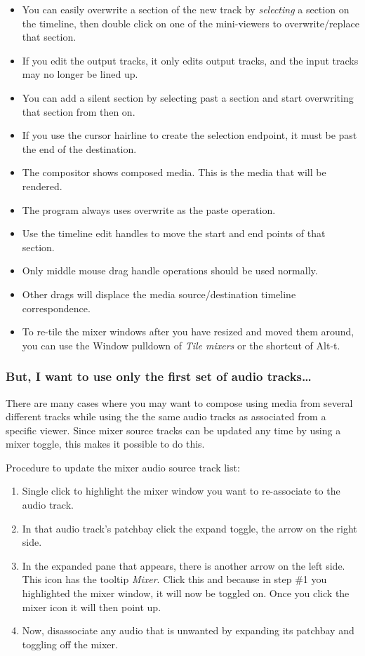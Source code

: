 \begin{itemize}
	\item You can easily overwrite a section of the new track by \textit{selecting} a section on the timeline, then double click on one of the mini-viewers to overwrite/replace that section.
	\item If you edit the output tracks, it only edits output tracks, and the input tracks may no longer be lined up.
	\item You can add a silent section by selecting past a section and start overwriting that section from then on.
	\item If you use the cursor hairline to create the selection endpoint, it must be past the end of the destination.
	\item The compositor shows composed media.  This is the media that will be rendered.
	\item The program always uses overwrite as the paste operation.
	\item Use the timeline edit handles to move the start and end points of that section.
	\item Only middle mouse drag handle operations should be used normally.
	\item Other drags will displace the media source/destination timeline correspondence.
	\item To re-tile the mixer windows after you have resized and moved them around, you can use the Window
	pulldown of \textit{Tile mixers} or the shortcut of Alt-t.
\end{itemize}

\subsubsection*{But, I want to use only the first set of audio tracks\dots}%
\label{ssub:but_use_only_first_audio}

There are many cases where you may want to compose using media from several different tracks while using the the same audio tracks as associated from a specific viewer.  Since mixer source tracks can be updated any time by using a mixer toggle, this makes it possible to do this.  

Procedure to update the mixer audio source track list:

\begin{enumerate}
	\item Single click to highlight the mixer window you want to re-associate to the audio track.
	\item In that audio track’s patchbay click the expand toggle, the arrow on the right side.
	\item In the expanded pane that appears, there is another arrow on the left side.  This icon has the tooltip \textit{Mixer}.  Click this and because in step \#1 you highlighted the mixer window, it will now be toggled on.  Once you click the mixer icon it will then point up.
	\item Now, disassociate any audio that is unwanted by expanding its patchbay and toggling off the mixer.
\end{enumerate}


